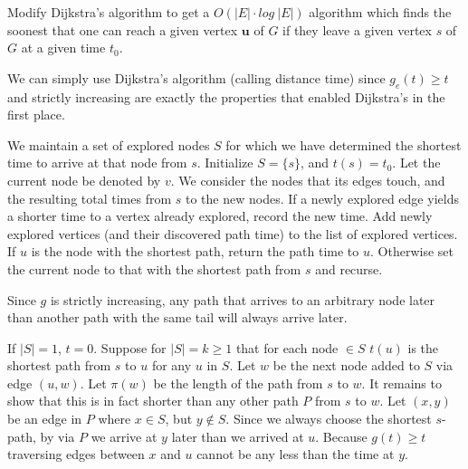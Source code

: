 \documentclass{amsart}
\theoremstyle{definition}
\theoremstyle{remark}
\numberwithin{equation}{section}
\begin{document}
Modify Dijkstra’s algorithm to get a $O(|E|\cdot log\ |E|)$ algorithm which
finds the soonest that one can reach a given vertex $\textbf{u}$ of $G$ if they
leave a given vertex $s$ of $G$ at a given time $t_0$.

\claimstar We can simply use Dijkstra's algorithm (calling distance
time) since $g_e(t) \geq t$ and strictly increasing are exactly the
properties that enabled Dijkstra's in the first place.


 We maintain a set of explored nodes $S$ for
which we have determined the shortest time to arrive at that node from
$s$. Initialize $S=\{s\}$, and $t(s) = t_0$. Let the current node be
denoted by $v$. We consider the nodes that its edges touch, and the
resulting total times from $s$ to the new nodes. If a newly explored
edge yields a shorter time to a vertex already explored, record the
new time. Add newly explored vertices (and their discovered path time)
to the list of explored vertices. If $u$ is the node with the shortest
path, return the path time to $u$. Otherwise set the current node to
that with the shortest path from $s$ and recurse.


% 

\rmkstar Since $g$ is strictly increasing, any path that arrives to an arbitrary node
later than another path with the same tail will always arrive later.

\proof
If $|S| = 1$, $t = 0$.
Suppose for $|S| = k \geq 1$ that for each node $\in S$ $t(u)$ is the shortest path from $s$
to $u$ for any $u$ in $S$. Let $w$ be the next node added to $S$ via edge $(u,w)$. Let
 $\pi(w)$ be the length of the path from $s$ to $w$. It remains to show that this is in
fact shorter than any other path $P$ from $s$ to $w$. Let $(x,y)$ be an edge in $P$
where $x \in S$, but $y \notin S$. Since we always choose the shortest $s$- path, by via $P$
we arrive at $y$ later than we arrived at $u$. Because $g(t) \geq t$ traversing edges
between $x$ and $u$ cannot be any less than the time at $y$. 
\end{document}
